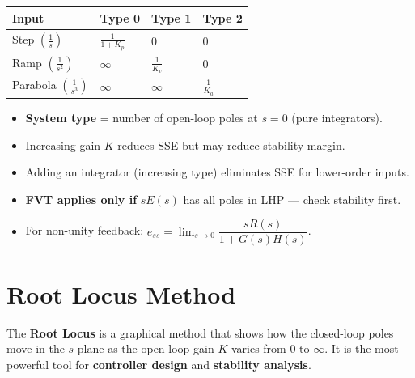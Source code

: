 \documentclass[12pt,a4paper]{article}
\renewcommand{\arraystretch}{1.45}
\begin{document}
{\renewcommand{\arraystretch}{1.9}%
\begin{tabularx}{\linewidth}{|>{\centering\arraybackslash}X|>{\centering\arraybackslash}X|>{\centering\arraybackslash}X|>{\centering\arraybackslash}X|}
\hline
\textbf{\color{myteal}Input} & \textbf{\color{myteal}Type 0} & \textbf{\color{myteal}Type 1} & \textbf{\color{myteal}Type 2} \\
\hline
Step $\left(\frac{1}{s}\right)$         & $\displaystyle\frac{1}{1+K_p}$ & $0$              & $0$ \\[6pt]
\hline
Ramp $\left(\frac{1}{s^2}\right)$       & $\infty$           & $\displaystyle\frac{1}{K_v}$ & $0$ \\[6pt]
\hline
Parabola $\left(\frac{1}{s^3}\right)$   & $\infty$           & $\infty$         & $\displaystyle\frac{1}{K_a}$ \\[6pt]
\hline
\end{tabularx}}

\begin{tcolorbox}[exambox, title={Exam Tips — SSE}]
\begin{itemize}[leftmargin=*, itemsep=3pt, topsep=0pt]
  \item \textbf{System type} = number of open-loop poles at $s=0$ (pure integrators).
  \item Increasing gain $K$ reduces SSE but may reduce stability margin.
  \item Adding an integrator (increasing type) eliminates SSE for lower-order inputs.
  \item \textbf{FVT applies only if} $sE(s)$ has all poles in LHP — check stability first.
  \item For non-unity feedback: $e_{ss} = \lim_{s\to0} \dfrac{sR(s)}{1+G(s)H(s)}$.
\end{itemize}
\end{tcolorbox}

\section{Root Locus Method}

The \textbf{Root Locus} is a graphical method that shows how the closed-loop poles move in the $s$-plane as the open-loop gain $K$ varies from $0$ to $\infty$. It is the most powerful tool for \textbf{controller design} and \textbf{stability analysis}.
\end{document}
